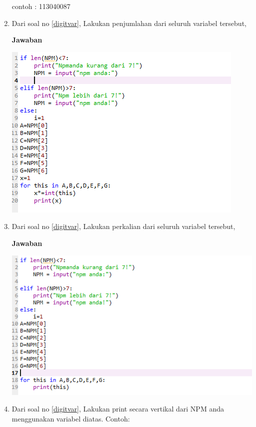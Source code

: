 \begin{enumerate}
\begin{center}
    \end{center}
contoh : 113040087
\item
Dari soal no \ref{digitvar}, Lakukan penjumlahan dari seluruh variabel tersebut,
\par\textbf{Jawaban}
    \begin{center}
        \centering
        \includegraphics[scale=1.5]{figures/chapter 2/18.PNG}
    \end{center}
\item 
Dari soal no \ref{digitvar}, Lakukan perkalian dari seluruh variabel tersebut,
\par\textbf{Jawaban}
    \begin{center}
        \centering
        \includegraphics[scale=1.5]{figures/chapter 2/19.PNG}
    \end{center}
\item
Dari soal no \ref{digitvar}, Lakukan print secara vertikal dari NPM anda menggunakan variabel diatas. Contoh:
\begin{verbatim}

\end{verbatim}
\end{enumerate}
